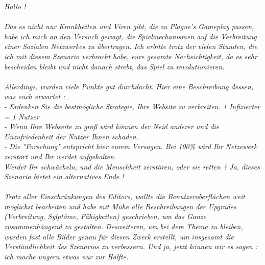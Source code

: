 \documentclass[10pt,a4paper]{article}
\begin{document}
\textit{Hallo !}\\
\\
\textit{Das es nicht nur Krankheiten und Viren gibt, die zu Plague's Gameplay passen, habe ich mich an den Versuch gewagt, die Spielmechanismen auf die Verbreitung einer Sozialen Netzwerkes zu übertragen. Ich erbitte trotz der vielen Stunden, die ich mit diesem Szenario verbracht habe, eure gesamte Nachsichtigkeit, da es sehr bescheiden bleibt und nicht danach strebt, das Spiel zu revolutionieren.}\\
\\
\textit{Allerdings, wurden viele Punkte gut durchdacht. Hier eine Beschreibung dessen, was euch erwartet :}\\
\textit{- Erdenken Sie die bestmögliche Strategie, Ihre Website zu verbreiten. 1 Infizierter = 1 Nutzer}\\
\textit{- Wenn Ihre Webseite zu groß wird können der Neid anderer und die Unzufriedenheit der Nutzer Ihnen schaden.}\\
\textit{- Die "Forschung" entspricht hier eurem Versagen. Bei 100\% wird Ihr Netzewerk zerstört und Ihr werdet aufgehalten.}\\
\textit{Werdet Ihr schwächeln, und die Menschheit zerstören, oder sie retten ? Ja, dieses Szenario bietet ein alternatives Ende !}\\
\\
\textit{Trotz aller Einschränkungen des Editors, wollte die Benutzeroberflächen weit möglichst bearbeiten und habe mit Mühe alle Beschreibungen der Upgrades (Verbreitung, Sylptôme, Fähigkeiten) geschrieben, um das Ganze zusammenhängend zu gestalten. Desweiteren, um bei dem Thema zu bleiben, wurden fast alle Bilder genau für diesen Zweck erstellt, um insgesamt die Verständlichkeit des Szenarios zu verbessern. Und ja, jetzt können wir es sagen : ich mache ungern etwas nur zur Hälfte.}
\end{document}
